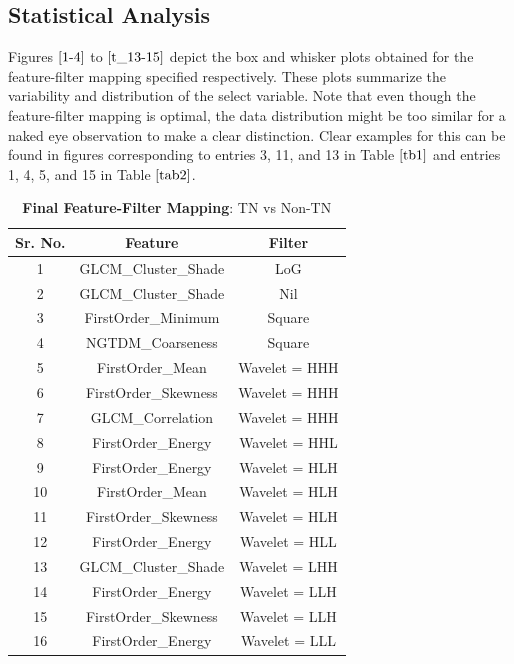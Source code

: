 \documentclass[10pt,final,1p,times,twocolumn]{elsarticle}
\begin{document}
\subsection{Statistical Analysis}

Figures $\ref{1-4}$ to $\ref{t_13-15}$ depict the box and whisker plots obtained for the feature-filter mapping specified respectively. These plots summarize the variability and distribution of the select variable. Note that even though the feature-filter mapping is optimal, the data distribution might be too similar for a naked eye observation to make a clear distinction. Clear examples for this can be found in figures corresponding to entries 3, 11, and 13 in Table $\ref{tb1}$ and entries 1, 4, 5, and 15 in Table $\ref{tab2}$.  

\begin{table}[!b]
\centering
\caption{\textbf{Final Feature-Filter Mapping}: TN vs Non-TN}
\label{tb1}
\begin{tabular}{| c | c | c |}
\hline
\textbf{Sr. No.} & \textbf{Feature} & \textbf{Filter}\\
\hline
1& GLCM\_Cluster\_Shade & LoG\\
\hline
2& GLCM\_Cluster\_Shade & Nil \\
\hline
3& FirstOrder\_Minimum & Square\\
\hline
4& NGTDM\_Coarseness & Square\\
\hline
5& FirstOrder\_Mean & Wavelet = HHH \\
\hline
6& FirstOrder\_Skewness & Wavelet = HHH\\
\hline
7& GLCM\_Correlation & Wavelet = HHH\\
\hline
8& FirstOrder\_Energy & Wavelet = HHL\\
\hline
9& FirstOrder\_Energy & Wavelet = HLH\\
\hline
10& FirstOrder\_Mean & Wavelet = HLH\\
\hline
11& FirstOrder\_Skewness & Wavelet = HLH\\
\hline
12& FirstOrder\_Energy & Wavelet = HLL\\
\hline
13& GLCM\_Cluster\_Shade & Wavelet = LHH\\
\hline
14& FirstOrder\_Energy & Wavelet = LLH\\
\hline
15& FirstOrder\_Skewness & Wavelet = LLH\\
\hline
16& FirstOrder\_Energy & Wavelet = LLL\\
\hline
\end{tabular}
\label{tab1}
\end{table}
\end{document}

